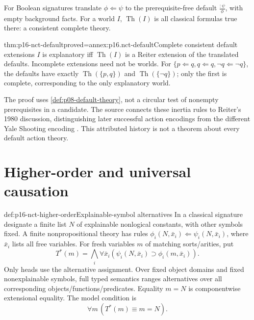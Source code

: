 For Boolean signatures translate \(\phi\Leftarrow\psi\) to the
prerequisite-free default \(\frac{:\psi}{\phi}\), with empty background facts.
For a world \(I\), \(\operatorname{Th}(I)\) is all classical formulas
true there: a consistent complete theory.

\begin{hbtheorem}{thm:p16-nct-default}{proved=annex:p16.nct-default}{Complete consistent default extensions}
\(I\) is explanatory iff \(\operatorname{Th}(I)\) is a Reiter extension of
the translated defaults. Incomplete extensions need not be worlds.
For \(\{p\Leftarrow q,q\Leftarrow q,\neg q\Leftarrow\neg q\}\), the defaults
have exactly \(\operatorname{Th}(\{p,q\})\) and
\(\operatorname{Th}(\{\neg q\})\); only the first is complete, corresponding
to the only explanatory world.
\end{hbtheorem}

The proof uses \cref{def:p08-default-theory}, not a circular test of
nonempty prerequisites in a candidate.
The source connects these inertia rules to Reiter's 1980 discussion,
distinguishing later successful action encodings from the different
Yale Shooting encoding \cite[pp.~771--772]{Turner2008NonmonotonicCausalLogic}.
This attributed history is not a theorem about every default action theory.

\section{Higher-order and universal causation}
\label{sec:p16-nct-representations}

\begin{hbdefinition}{def:p16-nct-higher-order}{Explainable-symbol alternatives}
In a classical signature designate a finite list \(N\) of explainable
nonlogical constants, with other symbols fixed.
A finite nonpropositional theory has rules
\(\phi_i(N,\bar x_i)\Leftarrow\psi_i(N,\bar x_i)\), where \(\bar x_i\)
lists all free variables. For fresh variables \(m\) of matching sorts/arities,
put
\[
 T^*(m)=\bigwedge_i\forall\bar x_i
             (\psi_i(N,\bar x_i)\supset\phi_i(m,\bar x_i)).
\]
Only heads use the alternative assignment. Over fixed object domains and
fixed nonexplainable symbols, full typed semantics ranges alternatives over
all corresponding objects/functions/predicates. Equality \(m=N\) is
componentwise extensional equality. The model condition is
\[
                         \forall m\,(T^*(m)\equiv m=N).
\]
\end{hbdefinition}

